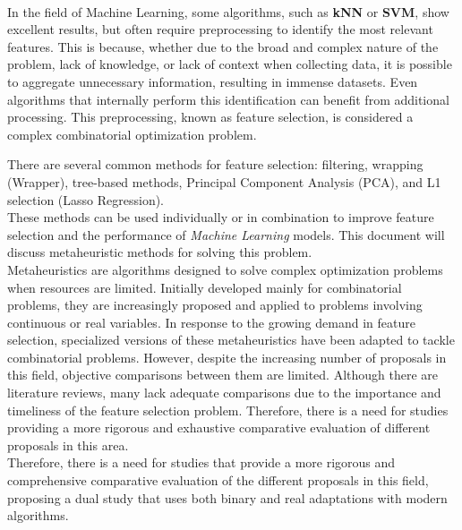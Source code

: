 \vspace{0.7cm}
\\

In the field of Machine Learning, some algorithms, such as \textbf{kNN} or \textbf{SVM}, show excellent results, but often require preprocessing to identify the most relevant features. This is because, whether due to the broad and complex nature of the problem, lack of knowledge, or lack of context when collecting data, it is possible to aggregate unnecessary information, resulting in immense datasets. Even algorithms that internally perform this identification can benefit from additional processing. This preprocessing, known as feature selection, is considered a complex combinatorial optimization problem.

There are several common methods for feature selection: filtering, wrapping (Wrapper), tree-based methods, Principal Component Analysis (PCA), and L1 selection (Lasso Regression).\\[6pt]

These methods can be used individually or in combination to improve feature selection and the performance of \textit{Machine Learning} models. This document will discuss metaheuristic methods for solving this problem.\\[6pt]

Metaheuristics are algorithms designed to solve complex optimization problems when resources are limited. Initially developed mainly for combinatorial problems, they are increasingly proposed and applied to problems involving continuous or real variables. In response to the growing demand in feature selection, specialized versions of these metaheuristics have been adapted to tackle combinatorial problems. However, despite the increasing number of proposals in this field, objective comparisons between them are limited. Although there are literature reviews, many lack adequate comparisons due to the importance and timeliness of the feature selection problem. Therefore, there is a need for studies providing a more rigorous and exhaustive comparative evaluation of different proposals in this area.\\[6pt]

Therefore, there is a need for studies that provide a more rigorous and comprehensive comparative evaluation of the different proposals in this field, proposing a dual study that uses both binary and real adaptations with modern algorithms.\\[6pt]

